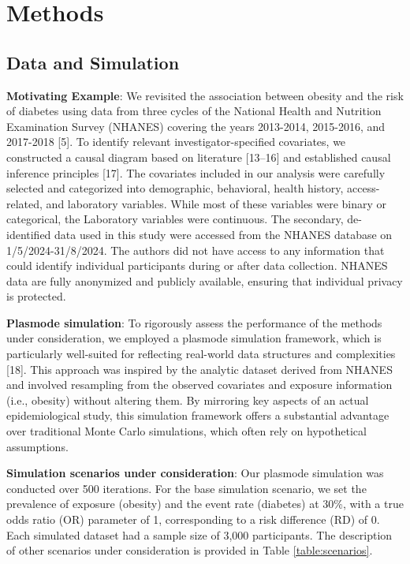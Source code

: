 \documentclass[10pt,letterpaper]{article}
\begin{document}
\section{Methods}\label{methods}

\subsection*{Data and Simulation}\label{data-and-simulation}

\textbf{Motivating Example}: We revisited the association between
obesity and the risk of diabetes using data from three cycles of the
National Health and Nutrition Examination Survey (NHANES) covering the
years 2013-2014, 2015-2016, and 2017-2018 {[}5{]}. To identify relevant
investigator-specified covariates, we constructed a causal diagram based
on literature {[}13--16{]} and established causal inference principles
{[}17{]}. The covariates included in our analysis were carefully
selected and categorized into demographic, behavioral, health history,
access-related, and laboratory variables. While most of these variables
were binary or categorical, the Laboratory variables were continuous.
The secondary, de-identified data used in this study were accessed from
the NHANES database on 1/5/2024-31/8/2024. The authors did not have
access to any information that could identify individual participants
during or after data collection. NHANES data are fully anonymized and
publicly available, ensuring that individual privacy is protected.

\textbf{Plasmode simulation}: To rigorously assess the performance of
the methods under consideration, we employed a plasmode simulation
framework, which is particularly well-suited for reflecting real-world
data structures and complexities {[}18{]}. This approach was inspired by
the analytic dataset derived from NHANES and involved resampling from
the observed covariates and exposure information (i.e., obesity) without
altering them. By mirroring key aspects of an actual epidemiological
study, this simulation framework offers a substantial advantage over
traditional Monte Carlo simulations, which often rely on hypothetical
assumptions.

\textbf{Simulation scenarios under consideration}: Our plasmode
simulation was conducted over 500 iterations. For the base simulation
scenario, we set the prevalence of exposure (obesity) and the event rate
(diabetes) at 30\%, with a true odds ratio (OR) parameter of 1,
corresponding to a risk difference (RD) of 0. Each simulated dataset had
a sample size of 3,000 participants. The description of other scenarios
under consideration is provided in Table \ref{table:scenarios}.
\end{document}
